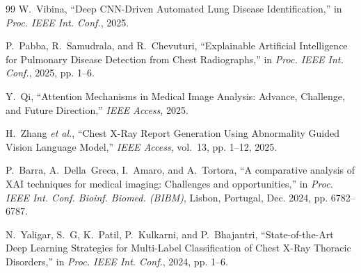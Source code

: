 \documentclass[journal]{IEEEtran}
\begin{document}
\begin{thebibliography}{99}
W.~Vibina, ``Deep CNN-Driven Automated Lung Disease Identification,'' in \emph{Proc. IEEE Int. Conf.}, 2025.

P.~Pabba, R.~Samudrala, and R.~Chevuturi, ``Explainable Artificial Intelligence for Pulmonary Disease Detection from Chest Radiographs,'' in \emph{Proc. IEEE Int. Conf.}, 2025, pp. 1--6.

Y.~Qi, ``Attention Mechanisms in Medical Image Analysis: Advance, Challenge, and Future Direction,'' \emph{IEEE Access}, 2025.

H.~Zhang \textit{et al.}, ``Chest X-Ray Report Generation Using Abnormality Guided Vision Language Model,'' \emph{IEEE Access}, vol.~13, pp. 1--12, 2025.

P.~Barra, A.~Della~Greca, I.~Amaro, and A.~Tortora, ``A comparative analysis of XAI techniques for medical imaging: Challenges and opportunities,'' in \emph{Proc. IEEE Int. Conf. Bioinf. Biomed. (BIBM)}, Lisbon, Portugal, Dec. 2024, pp. 6782--6787.

N.~Yaligar, S.~G, K.~Patil, P.~Kulkarni, and P.~Bhajantri, ``State-of-the-Art Deep Learning Strategies for Multi-Label Classification of Chest X-Ray Thoracic Disorders,'' in \emph{Proc. IEEE Int. Conf.}, 2024, pp. 1--6.

\end{thebibliography}
\end{document}
